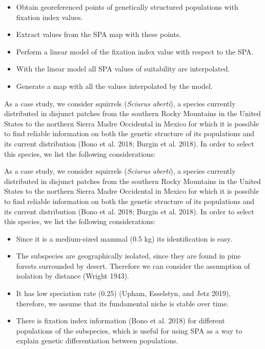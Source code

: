 \documentclass[
]{article}
\providecommand{\tightlist}{%
  \setlength{\itemsep}{0pt}\setlength{\parskip}{0pt}}
\begin{document}
\begin{itemize}
\tightlist
\item
  Obtain georeferenced points of genetically structured populations with
  fixation index values.
\item
  Extract values from the SPA map with these points.
\item
  Perform a linear model of the fixation index value with respect to the
  SPA.
\item
  With the linear model all SPA values of suitability are interpolated.
\item
  Generate a map with all the values interpolated by the model.
\end{itemize}

As a case study, we consider squirrels (\emph{Sciurus aberti}), a species
currently distributed in disjunct patches from the southern Rocky
Mountains in the United States to the northern Sierra Madre Occidental
in Mexico for which it is possible to find reliable information on both
the genetic structure of its populations and its current distribution
(Bono et al. 2018; Burgin et al. 2018). In order to select this species,
we list the following considerations:

As a case study, we consider squirrels (\emph{Sciurus aberti}), a
species currently distributed in disjunct patches from the southern
Rocky Mountains in the United States to the northern Sierra Madre
Occidental in Mexico for which it is possible to find reliable
information on both the genetic structure of its populations and its
current distribution (Bono et al. 2018; Burgin et al. 2018). In order to
select this species, we list the following considerations:

\begin{itemize}
\tightlist
\item
  Since it is a medium-sized mammal (0.5 kg) its identification is easy.
\item
  The subspecies are geographically isolated, since they are found in
  pine forests surrounded by desert. Therefore we can consider the
  assumption of isolation by distance (Wright 1943).
\item
  It has low speciation rate (0.25) (Upham, Esselstyn, and Jetz 2019),
  therefore, we assume that its fundamental niche is stable over time.
\item
  There is fixation index information (Bono et al. 2018) for different
  populations of the subspecies, which is useful for using SPA as a way
  to explain genetic differentiation between populations.
\end{itemize}
\end{document}
